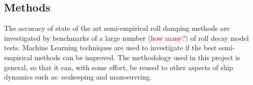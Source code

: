 \subsection{Methods}
The accuracy of state of the art semi-empirical roll damping methods are investigated by benchmarks of a large number \textcolor{red}{(how many?)} of roll decay model tests. Machine Learning techniques are used to investigate if the best semi-empirical methods can be improved. The methodology used in this project is general, so that it can, with some effort, be reused to other aspects of ship dynamics such as: seakeeping and manoeuvring.

			

